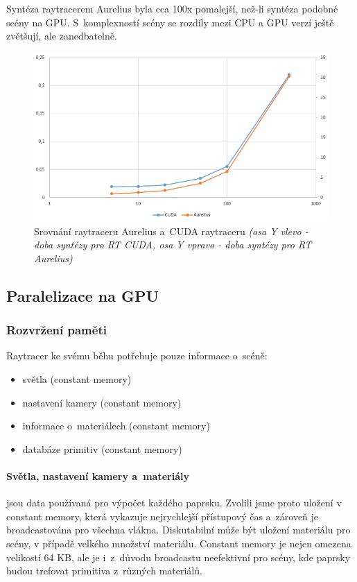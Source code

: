 \documentclass[12pt,a4paper,titlepage,final]{report}
\begin{document}
Syntéza raytracerem Aurelius byla cca 100x pomalejší, než-li syntéza podobné scény na GPU. S~komplexností scény se rozdíly mezi CPU a GPU verzí ještě zvětšují, ale zanedbatelně.


\begin{figure}
\begin{center}
\includegraphics[width=16cm]{images/srovnani.png}
\caption{Srovnání raytraceru Aurelius a~CUDA raytraceru \textit{(osa Y vlevo - doba syntézy pro RT CUDA, osa Y vpravo - doba syntézy pro RT Aurelius)}}
\end{center}
\end{figure}

\subsection{Paralelizace na GPU}

\subsubsection{Rozvržení paměti} 

Raytracer ke svému běhu potřebuje pouze informace o~scéně:
\begin{itemize}
	\item světla (constant memory)
	\item nastavení kamery (constant memory)
	\item informace o~materiálech (constant memory)
	\item databáze primitiv (constant memory)
\end{itemize}

\paragraph{Světla, nastavení kamery a~materiály} jsou data používaná pro výpočet každého paprsku. Zvolili jsme proto uložení v constant memory, která vykazuje nejrychlejší přístupový čas a~zároveň je broadcastována pro všechna vlákna. Diskutabilní může být uložení materiálu pro scény, v případě velkého množství materiálu. Constant memory je nejen omezena velikostí 64 KB, ale je i~z~důvodu broadcastu neefektivní pro scény, kde paprsky budou trefovat primitiva z~různých materiálů.
\end{document}
